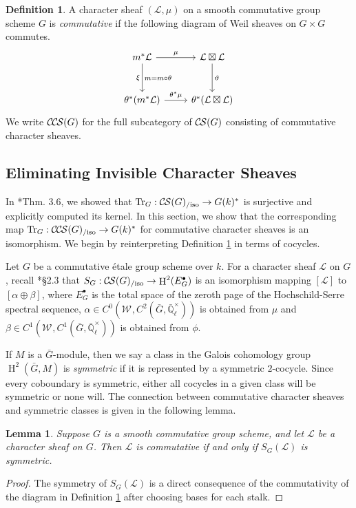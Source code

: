 \documentclass[10pt]{amsart}
\theoremstyle{plain}
\newtheorem{lemma}[theorem]{Lemma}
\theoremstyle{definition}
\newtheorem{definition}[theorem]{Definition}
\newcommand{\EE}{\mathbb{\bar Q}_\ell}
\newcommand{\EEx}{\EE^\times}
\newcommand{\Weil}[1]{\mathcal{W}_{#1}}
\DeclareMathOperator{\Hh}{H}
\newcommand{\TrFrob}[1]{\operatorname{Tr}_{#1}}
\newcommand{\cs}[1]{{\mathcal{#1}}}
\newcommand{\CS}{{\mathcal{C\hskip-0.8pt S}}}
\newcommand{\CCS}{{\mathcal{C\hskip-.8pt C\hskip-0.8pt S}}}
\newcommand{\CSiso}[1]{\CS(#1)_{/\text{iso}}}
\newcommand{\CCSiso}[1]{\CCS(#1)_{/\text{iso}}}
\newcommand{\bG}{\bar{G}}
\begin{document}
\begin{definition}\label{def:CCScom}
A character sheaf $(\cs{L}, \mu)$ on a smooth commutative group scheme $G$ is \emph{commutative}
if the following diagram of Weil sheaves on $G \times G$ commutes.
  \[
  \begin{tikzcd}[row sep=30]
   m^*\cs{L} \arrow{d}[swap]{\xi}{m= m\circ\theta} \arrow{r}{\mu} & \cs{L}\boxtimes\cs{L} \arrow{d}{\vartheta}\\
   \theta^*(m^*\cs{L}) \arrow{r}{{\theta}^*\mu} &  \theta^*(\cs{L}\boxtimes\cs{L})
  \end{tikzcd}
  \]
We write $\CCS(G)$ for the full subcategory of $\CS(G)$ consisting of commutative character sheaves.
 \end{definition}

\subsection{Eliminating Invisible Character Sheaves}\label{ssec:defect}

In \cite{cunningham-roe:13a}*{Thm. 3.6}, we showed that $\TrFrob{G} : \CSiso{G} \to G(k)^*$ is surjective and
explicitly computed its kernel.  In this section, we show that the corresponding map
$\TrFrob{G} : \CCSiso{G} \to G(k)^*$ for commutative character sheaves is an isomorphism.
We begin by reinterpreting Definition \ref{def:CCScom} in terms of cocycles.

Let $G$ be a commutative \'etale group scheme over $k$. For a character sheaf $\cs{L}$ on $G$, recall
\cite{cunningham-roe:13a}*{\S 2.3} that $S_G : \CSiso{G} \to \Hh^2(E_G^\bullet)$ is an isomorphism mapping
$[\cs{L}]$ to $[\alpha \oplus \beta]$, where $E_G^\bullet$ is the total space of the zeroth page
of the Hochschild-Serre spectral sequence, $\alpha \in C^0(\Weil{}, C^2(\bG, \EEx))$ is obtained from $\mu$ and
$\beta \in C^1(\Weil{}, C^1(\bG, \EEx))$ is obtained from $\phi$.

If $M$ is a $\bG$-module, then we say a class in the Galois cohomology group $\Hh^2(\bG, M)$
is \emph{symmetric} if it is represented by a symmetric $2$-cocycle.  Since every coboundary is symmetric,
either all cocycles in a given class will be symmetric or none will.  The connection between
commutative character sheaves and symmetric classes is given in the following lemma.
\todo{Define symmetric for element of $\Hh^2(E_G^\bullet)$.}

\begin{lemma} \label{lem:symccslink}
Suppose $G$ is a smooth commutative group scheme, and let $\cs{L}$ be a character sheaf on $G$.
Then $\cs{L}$ is commutative if and only if $S_G(\cs{L})$ is symmetric.
\end{lemma}
\begin{proof}
The symmetry of $S_G(\cs{L})$ is a direct consequence of the commutativity of the diagram in Definition \ref{def:CCScom}
after choosing bases for each stalk.
\end{proof}
\end{document}
